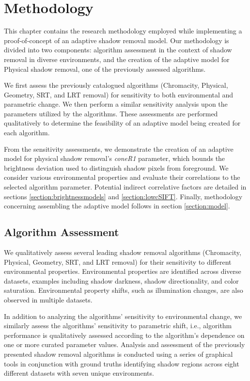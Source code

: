 \clearpage
\chapter{Methodology} \label{chapter:methodology}

This chapter contains the research methodology employed while implementing a proof-of-concept of an adaptive shadow removal model. Our methodology is divided into two components: algorithm assessment in the context of shadow removal in diverse environments, and the creation of the adaptive model for Physical shadow removal, one of the previously assessed algorithms.

We first assess the previously catalogued algorithms (Chromacity, Physical, Geometry, SRT, and LRT removal) for sensitivity to both environmental and parametric change. We then perform a similar sensitivity analysis upon the parameters utilized by the algorithms. These assessments are performed qualitatively to determine the feasibility of an adaptive model being created for each algorithm.

From the sensitivity assessments, we demonstrate the creation of an adaptive model for physical shadow removal's \textit{coneR1} parameter, which bounds the brightness deviation used to distinguish shadow pixels from foreground. We consider various environmental properties and evaluate their correlations to the selected algorithm parameter. Potential indirect correlative factors are detailed in sections \ref{section:brightnessmodels} and \ref{section:lowcSIFT}. Finally, methodology concerning assembling the adaptive model follows in section \ref{section:model}.

\section{Algorithm Assessment}

We qualitatively assess several leading shadow removal algorithms (Chromacity, Physical, Geometry, SRT, and LRT removal) for their sensitivity to different environmental properties. Environmental properties are identified across diverse datasets, examples including shadow darkness, shadow directionality, and color saturation. Environmental property shifts, such as illumination changes, are also observed in multiple datasets.

In addition to analyzing the algorithms' sensitivity to environmental change, we similarly assess the algorithms' sensitivity to parametric shift, i.e., algorithm performance is qualitatively assessed according to the algorithm's dependence on one or more curated parameter values. Analysis and assessment of the previously presented shadow removal algorithms is conducted using a series of graphical tools in conjunction with ground truths identifying shadow regions across eight different datasets with seven unique environments.

